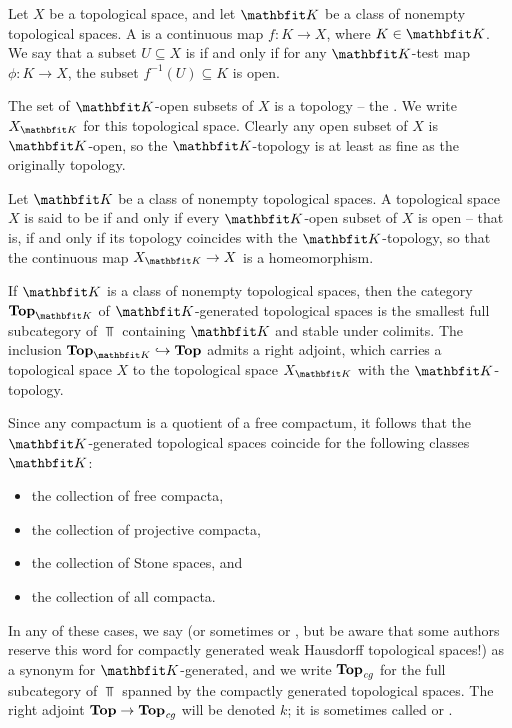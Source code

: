 \begin{dfn}
	Let $ X $ be a topological space, and let $ \KK $ be a class of nonempty topological spaces.
	A  is a continuous map $ f \colon K \to X $, where $ K \in \KK $.
	We say that a subset $ U \subseteq X $ is  if and only if for any $ \KK $-test map $ \phi \colon K \to X $, the subset $ f^{-1}(U) \subseteq K $ is open.
\end{dfn}

\begin{nul}
	The set of $ \KK $-open subsets of $ X $ is a topology -- the .
	We write $ X_{\KK} $ for this topological space.
	Clearly any open subset of $ X $ is $ \KK $-open, so the $ \KK $-topology is at least as fine as the originally topology.
\end{nul}

\begin{dfn}
	Let $ \KK $ be a class of nonempty topological spaces.
	A topological space $ X $ is said to be  if and only if every $ \KK $-open subset of $ X $ is open -- that is, if and only if its topology coincides with the $ \KK $-topology, so that the continuous map $ X_{\KK} \to X $ is a homeomorphism.
\end{dfn}

\begin{nul}
	If $ \KK $ is a class of nonempty topological spaces, then the category $ \Top_{\KK} $ of $ \KK $-generated topological spaces is the smallest full subcategory of $ \Top $ containing $ \KK $ and stable under colimits.
	The inclusion $ \Top_{\KK} \inclusion \Top $ admits a right adjoint, which carries a topological space $ X $ to the topological space $ X_{\KK} $ with the $ \KK $-topology.
\end{nul}

\begin{exm}
	Since any compactum is a quotient of a free compactum, it follows that the $ \KK $-generated topological spaces coincide for the following classes $ \KK $:
	\begin{itemize}
		\item the collection of free compacta,
		\item the collection of projective compacta,
		\item the collection of Stone spaces, and
		\item the collection of all compacta.
	\end{itemize}
	In any of these cases, we say  (or sometimes  or , but be aware that some authors reserve this word for compactly generated weak Hausdorff topological spaces!) as a synonym for $ \KK $-generated, and we write $ \textbf{\textup{Top}}_{\textit{cg}} $ for the full subcategory of $ \Top $ spanned by the compactly generated topological spaces.
	The right adjoint $ \textbf{\textup{Top}} \to \textbf{\textup{Top}}_{\textit{cg}} $ will be denoted $ k $;
	it is sometimes called  or .
\end{exm}

